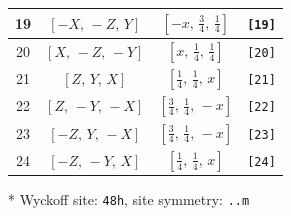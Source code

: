 \documentclass[fleqn,8pt]{jsarticle}
\begin{document}
\begin{longtable}{cccc}
19 & $\left[ - X,\, - Z,\, Y \right]$ & $\left[ - x,\, \frac{3}{4},\, \frac{1}{4} \right]$ & {\tt [19]} \\ \hline
20 & $\left[ X,\, - Z,\, - Y \right]$ & $\left[ x,\, \frac{1}{4},\, \frac{1}{4} \right]$ & {\tt [20]} \\ \hline
21 & $\left[ Z,\, Y,\, X \right]$ & $\left[ \frac{1}{4},\, \frac{1}{4},\, x \right]$ & {\tt [21]} \\ \hline
22 & $\left[ Z,\, - Y,\, - X \right]$ & $\left[ \frac{3}{4},\, \frac{1}{4},\, - x \right]$ & {\tt [22]} \\ \hline
23 & $\left[ - Z,\, Y,\, - X \right]$ & $\left[ \frac{3}{4},\, \frac{1}{4},\, - x \right]$ & {\tt [23]} \\ \hline
24 & $\left[ - Z,\, - Y,\, X \right]$ & $\left[ \frac{1}{4},\, \frac{1}{4},\, x \right]$ & {\tt [24]} \\
\end{longtable}
* Wyckoff site: {\tt 48h}, site symmetry: {\tt ..m}
\renewcommand{\arraystretch}{1.2}
\end{document}
